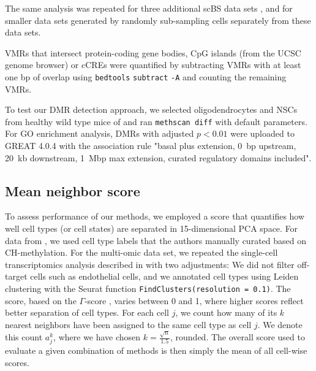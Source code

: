 \documentclass[10pt]{article}
\begin{document}
The same analysis was repeated for three additional scBS data sets \citep{luo2017single, bian2018single, argelaguet2019gastru}, and for smaller data sets generated by randomly sub-sampling cells separately from these data sets.

VMRs that intersect protein-coding gene bodies, CpG islands (from the UCSC genome browser) or cCREs were quantified by subtracting VMRs with at least one bp of overlap using \texttt{bedtools} \texttt{subtract} \texttt{-A} \citep{quinlan2010bedtools} and counting the remaining VMRs.


To test our DMR detection approach, we selected oligodendrocytes and NSCs from healthy wild type mice of \citet{kremer_scnmt} and ran \texttt{methscan diff} with default parameters.
For GO enrichment analysis, DMRs with adjusted $p<0.01$ were uploaded to GREAT 4.0.4 \citep{mclean2010great} with the association rule "basal plus extension, 0~bp upstream, 20~kb downstream, 1~Mbp max extension, curated regulatory domains included".

\subsection*{Mean neighbor score} \label{methods:score}
To assess performance of our methods, we employed a score that quantifies how well cell types (or cell states) are separated in 15-dimensional PCA space.
For data from \citet{luo2017single}, we used cell type labels that the authors manually curated based on CH-methylation.
For the multi-omic data set, we repeated the single-cell transcriptomics analysis described in \citet{kremer_scnmt} with two adjustments:
We did not filter off-target cells such as endothelial cells, and we annotated cell types using Leiden clustering with the Seurat \citep{seurat5} function \texttt{FindClusters(resolution = 0.1)}.
The score, based on the $\Gamma$-score \citep{Kireeva_2014}, varies between 0 and 1, where higher scores reflect better separation of cell types.
For each cell $j$, we count how many of its $k$ nearest neighbors have been assigned to the same cell type as cell $j$.
We denote this count $a^k_j$, where we have chosen $k=\frac{\sqrt{n}}{1.5}$, rounded.
The overall score used to evaluate a given combination of methods is then simply the mean of all cell-wise scores.
\end{document}
